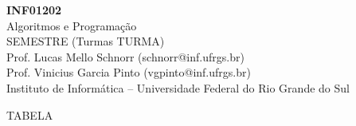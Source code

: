 \documentclass[11pt,portuguese,]{article}
\begin{document}
\clearpage\thispagestyle{empty}

\begin{center}
  {\LARGE     {\bf INF01202} \\
    Algoritmos e Programação \\
    SEMESTRE (Turmas TURMA)} \\
  Prof. Lucas Mello Schnorr (schnorr@inf.ufrgs.br) \\
  Prof. Vinicius Garcia Pinto (vgpinto@inf.ufrgs.br) \\
  Instituto de Informática -- Universidade Federal do Rio Grande do Sul
\end{center}

TABELA
\end{document}
